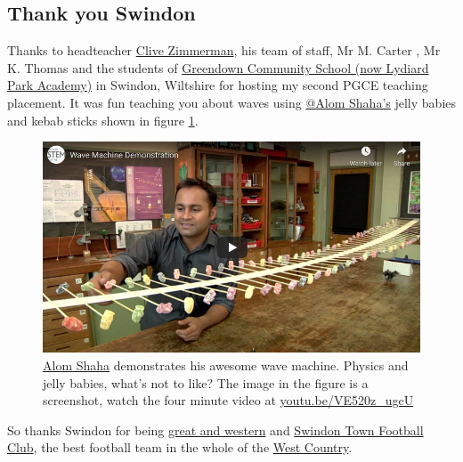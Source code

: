 \documentclass[
]{book}
\begin{document}
\hypertarget{swindon}{%
\subsection{Thank you Swindon}\label{swindon}}

Thanks to headteacher \href{https://www.swindonadvertiser.co.uk/news/14113118.lydiard-school-looking-to-help-others-improve-gcse-results/}{Clive Zimmerman}, his team of staff, Mr M. Carter , Mr K. Thomas and the students of \href{https://en.wikipedia.org/wiki/Lydiard_Park_Academy}{Greendown Community School (now Lydiard Park Academy)} in Swindon, Wiltshire for hosting my second PGCE teaching placement. It was fun teaching you about waves using \href{https://twitter.com/alomshaha}{@Alom Shaha's} jelly babies and kebab sticks shown in figure \ref{fig:shaha-fig}.

\begin{figure}

{\centering \includegraphics[width=0.99\linewidth]{images/youtube-alom} 

}

\caption{\href{https://alomshaha.com/}{Alom Shaha} demonstrates his awesome wave machine. Physics and jelly babies, what's not to like? \citep{youtube-alom} The image in the figure is a screenshot, watch the four minute video at \href{https://youtu.be/VE520z_ugcU}{youtu.be/VE520z\_ugcU}}\label{fig:shaha-fig}
\end{figure}



So thanks Swindon for being \href{https://en.wikipedia.org/wiki/Great_Western_Railway}{great and western} and \href{https://en.wikipedia.org/wiki/Swindon_Town_F.C.}{Swindon Town Football Club}, the best football team in the whole of the \href{https://en.wikipedia.org/wiki/West_Country}{West Country}. 🙏
\end{document}
